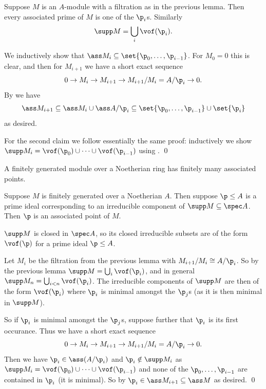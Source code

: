 \eproof

\blemm

    Suppose $M$ is an $A$-module with a filtration as in the previous lemma.
    Then every associated prime of $M$ is one of the $\p_i$s.
    Similarly
    $$ \supp M = \bigcup_i\vof(\p_i) . $$

\elemm

\bproof

    We inductively show that $\ass M_i\subseteq\set{\p_0,\dots,\p_{i-1}}$.
    For $M_0=0$ this is clear, and then for $M_{i+1}$ we have a short exact sequence
    $$ 0 \to M_i \to M_{i+1} \to M_{i+1}/M_i = A/\p_i \to 0 . $$
    By  we have
    $$ \ass M_{i+1} \subseteq \ass M_i \cup \ass A/\p_i \subseteq \set{\p_0,\dots,\p_{i-1}} \cup \set{\p_i} $$
    as desired.

    For the second claim we follow essentially the same proof: inductively we show $\supp M_i=\vof(\p_0)\cup\cdots\cup\vof(\p_{i-1})$
    using .
    \qed

\eproof

\bcoro

    A finitely generated module over a Noetherian ring has finitely many associated points.

\ecoro

\blemm

    Suppose $M$ is finitely generated over a Noetherian $A$.
    Then suppose $\p\leq A$ is a prime ideal corresponding to an irreducible component of $\supp M\subseteq\spec A$.
    Then $\p$ is an associated point of $M$.

\elemm

\bnote

    $\supp M$ is closed in $\spec A$, so its closed irreducible subsets are of the form $\vof(\p)$ for a prime ideal $\p\leq A$.

\enote

\bproof

    Let $M_i$ be the filtration from the previous lemma with $M_{i+1}/M_i\cong A/\p_i$.
    So by the previous lemma $\supp M=\bigcup_i\vof(\p_i)$, and in general $\supp M_n=\bigcup_{i<n}\vof(\p_i)$.
    The irreducible components of $\supp M$ are then of the form $\vof(\p_i)$ where $\p_i$ is minimal amongst the $\p_j$s (as it is then minimal in $\supp M$).

    So if $\p_i$ is minimal amongst the $\p_j$s, suppose further that $\p_i$ is its first occurance.
    Thus we have a short exact sequence
    $$ 0 \to M_i \to M_{i+1} \to M_{i+1}/M_i = A/\p_i \to 0 . $$
    Then we have $\p_i\in\ass(A/\p_i)$ and $\p_i\notin\supp M_i$ as $\supp M_i=\vof(\p_0)\cup\cdots\cup\vof(\p_{i-1})$ and none of the $\p_0,\dots,\p_{i-1}$ are contained in $\p_i$ (it is minimal).
    So by  $\p_i\in\ass M_{i+1}\subseteq\ass M$ as desired.
    \qed

